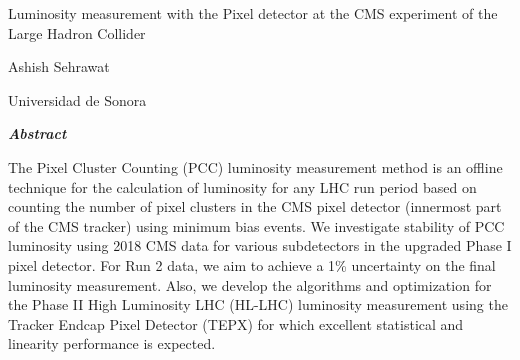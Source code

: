 \documentclass[final,3p]{CSP}
\def\Student{Ashish Sehrawat}
\def\Universidad{Universidad de Sonora}
\def\ProjectTitle{Luminosity measurement with the Pixel detector at the CMS experiment of the Large Hadron Collider }
\begin{document}
\begin{adjustwidth}{1cm}{1cm}

  \begin{center}
    {\Large \ProjectTitle \par}
    \vspace{0.5cm}

    {\Student \par}
    {\Universidad \par}  
    \vspace{1cm}
    
    {\itshape\textbf{Abstract}\par}
     \vspace{0.7 cm}
        
    \end{center}  

 
  \onehalfspacing The Pixel Cluster Counting (PCC) luminosity measurement method is an offline technique for the calculation of luminosity for any LHC run period based on counting the number of pixel clusters in the CMS pixel detector (innermost part of the CMS tracker) using minimum bias events. We investigate stability of PCC luminosity using 2018 CMS data for various subdetectors in the upgraded Phase I pixel detector. For Run 2 data, we aim to achieve a 1\% uncertainty on the final luminosity measurement. Also, we develop the algorithms and optimization for the Phase II High Luminosity LHC (HL-LHC) luminosity measurement using the Tracker Endcap Pixel Detector (TEPX) for which excellent statistical and linearity performance is expected.


    
\end{adjustwidth}

\hspace{2pt}
\vspace{1 cm}

\clearpage
\shipout\null


\newpage
\tableofcontents

\clearpage
\newpage





















\cleardoublepage
\onehalfspacing


\end{document}
